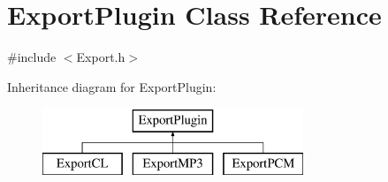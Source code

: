 \hypertarget{class_export_plugin}{}\section{Export\+Plugin Class Reference}
\label{class_export_plugin}


{\ttfamily \#include $<$Export.\+h$>$}

Inheritance diagram for Export\+Plugin\+:\begin{figure}[H]
\begin{center}
\leavevmode
\includegraphics[height=2.000000cm]{class_export_plugin}
\end{center}
\end{figure}
